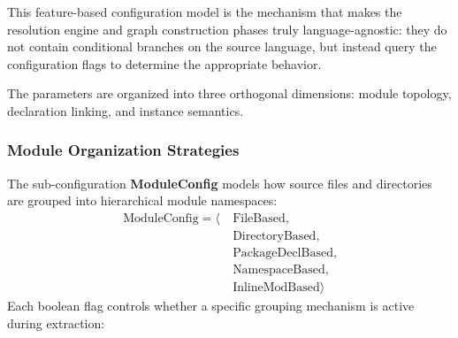 This feature-based configuration model is the mechanism that makes
the resolution engine and graph construction phases truly
language-agnostic: they do not contain conditional branches on the
source language, but instead query the configuration flags to
determine the appropriate behavior.

The parameters are organized into three orthogonal dimensions:
module topology, declaration linking, and instance semantics.

\subsubsection{Module Organization Strategies}

The sub-configuration \textbf{ModuleConfig} models how source files
and directories are grouped into hierarchical module namespaces:
\begin{align*}
  \text{ModuleConfig} = \langle&\ \text{FileBased}, \\
  &\ \text{DirectoryBased}, \\
  &\ \text{PackageDeclBased}, \\
  &\ \text{NamespaceBased}, \\
  &\ \text{InlineModBased} \rangle
\end{align*}
Each boolean flag controls whether a specific grouping mechanism is
active during extraction:
